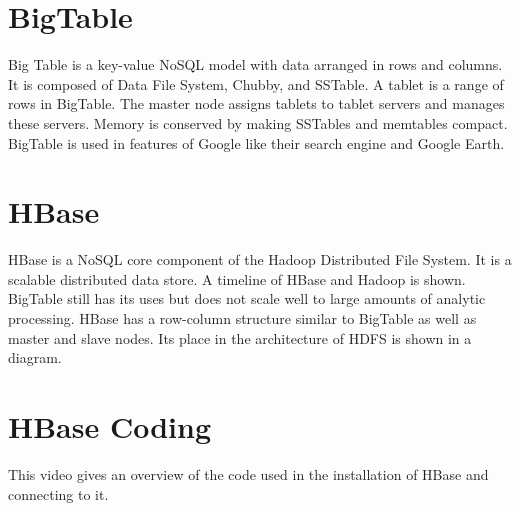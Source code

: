 \section{BigTable}

Big Table is a key-value NoSQL model with data arranged in rows and
columns. It is composed of Data File System, Chubby, and SSTable. A
tablet is a range of rows in BigTable. The master node assigns tablets
to tablet servers and manages these servers. Memory is conserved by
making SSTables and memtables compact. BigTable is used in features of
Google like their search engine and Google Earth.




\section{HBase}

HBase is a NoSQL core component of the Hadoop Distributed File System.
It is a scalable distributed data store. A timeline of HBase and Hadoop
is shown. BigTable still has its uses but does not scale well to large
amounts of analytic processing. HBase has a row-column structure similar
to BigTable as well as master and slave nodes. Its place in the
architecture of HDFS is shown in a diagram.




\section{HBase Coding}

This video gives an overview of the code used in the installation of
HBase and connecting to it.



